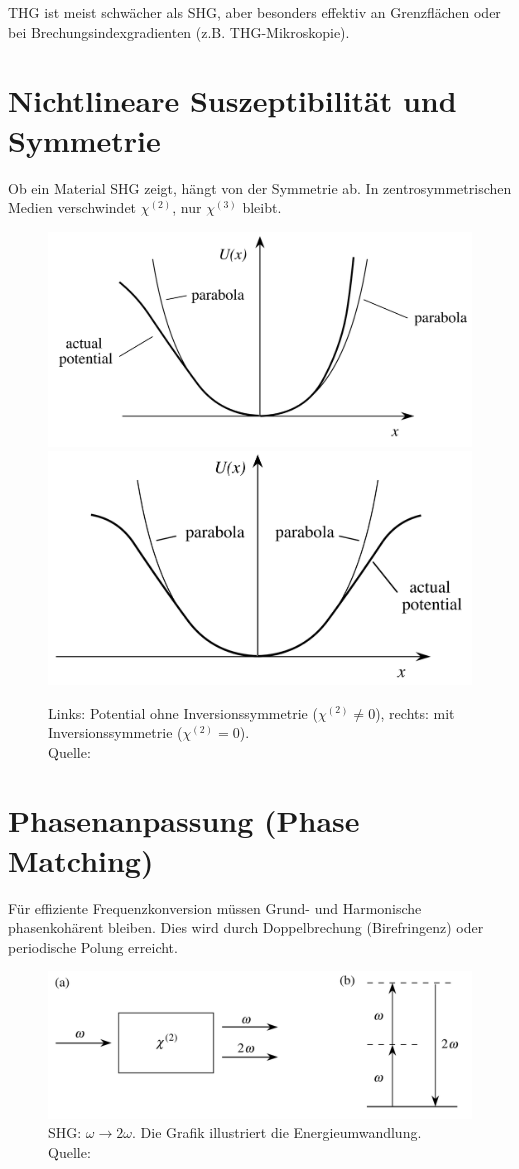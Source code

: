 \documentclass[9pt,a4paper,twocolumn,twoside]{tau-class/tau}
\newcommand{\figcite}[1]{\\[0mm]{\tiny Quelle: \cite{#1}}}
\begin{document}
THG ist meist schwächer als SHG, aber besonders effektiv an Grenzflächen oder bei Brechungsindexgradienten (z.B. THG-Mikroskopie).


\section{Nichtlineare Suszeptibilität und Symmetrie}
Ob ein Material SHG zeigt, hängt von der Symmetrie ab. In zentrosymmetrischen Medien verschwindet $\chi^{(2)}$, nur $\chi^{(3)}$ bleibt.

\begin{figure}[!ht]
\centering
\includegraphics[width=0.45\columnwidth]{../praes/Images/pot_noncentrosym.png}
\includegraphics[width=0.45\columnwidth]{../praes/Images/pot_centrosym.png}
\caption{Links: Potential ohne Inversionssymmetrie ($\chi^{(2)} \neq 0$), rechts: mit Inversionssymmetrie ($\chi^{(2)} = 0$).\figcite{Boyd2020}}
\end{figure}


\section{Phasenanpassung (Phase Matching)}
Für effiziente Frequenzkonversion müssen Grund- und Harmonische phasenkohärent bleiben. Dies wird durch Doppelbrechung (Birefringenz) oder periodische Polung erreicht.

\begin{figure}[!ht]
\centering
\includegraphics[width=0.98\columnwidth]{../praes/Images/shg.png}
\caption{SHG: $\omega \rightarrow 2\omega$. Die Grafik illustriert die Energieumwandlung.\figcite{Boyd2020}}
\end{figure}
\end{document}
